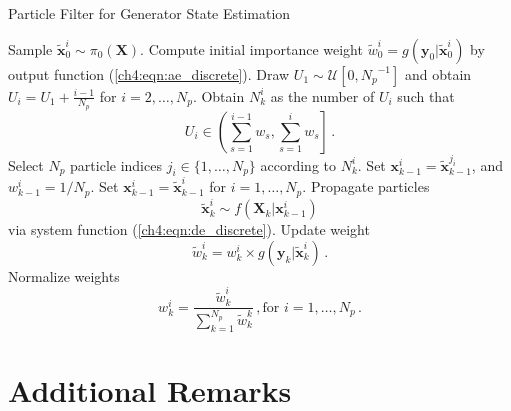 \begin{algorithm}
\caption{Particle Filter for Generator State Estimation}\label{alg:particle_filter}
\begin{algorithmic}[1]
  
\State Sample $\tilde{\boldsymbol{x}}_0^{i} \sim \pi_0(\boldsymbol{X})$.
\State Compute initial importance weight
$
\tilde{w}_0^{i} = g(\boldsymbol{y}_0 | \tilde{\boldsymbol{x}}_0^{i})
$ by output function (\ref{ch4:eqn:ae_discrete}).
\EndFor
{}
 
\State Draw $U_{1} \sim \mathcal{U}\left[0, {N_p}^{-1}\right]$ and obtain $U_{i}=U_{1}+\frac{i-1}{N_p}$ for $i=2, \ldots, N_p$.
\State Obtain $N_k^{i}$ as the number of $U_i$ such that
$$
U_i \in \left(\sum_{s=1}^{i-1} w_{s}, \sum_{s=1}^{i} w_{s}\right] \,.
$$ 
\State Select $N_p$ particle indices $j_i \in \{1, \dots, N_p\}$ according to $N_k^{i}$.
\State Set $\boldsymbol{x}_{k-1}^{i} = \tilde{\boldsymbol{x}}_{k-1}^{j_i}$, and $w_{k-1}^{i} = 1/N_p$.
\EndFor
\Else 
\State Set $\boldsymbol{x}_{k-1}^{i} = \tilde{\boldsymbol{x}}_{k-1}^{i}$ for $i=1, \ldots, N_p$.
\EndIf
{}
\State Propagate particles 
$$
\tilde{\boldsymbol{x}}_k^{i} \sim f(\boldsymbol{X}_k|\boldsymbol{x}_{k-1}^{i})
$$ via system function (\ref{ch4:eqn:de_discrete}).
\State Update weight 
$$
\tilde{w}_k^{i} = {w}_k^{i} \times g(\boldsymbol{y}_k | \tilde{\boldsymbol{x}}_k^{i}) \,.
$$
\EndFor
\State Normalize weights
$$
w_k^{i} = \frac{\tilde{w}_k^{i}}{\sum_{k=1}^{N_p}\tilde{w}_k^{k}} \,, \text{for } i = 1, \dots, N_p \,.
$$
\EndFor
\end{algorithmic}
\end{algorithm}



\section{Additional Remarks} %
\label{ssub:additional_remarks}
